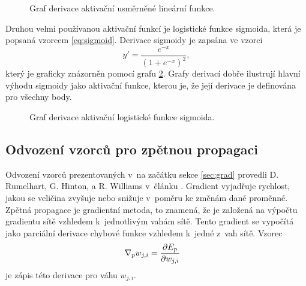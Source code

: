 \begin{figure}
\begin{adjustbox}{center}
\end{adjustbox}
\caption{Graf derivace aktivační usměrněné lineární funkce.}
\label{gr:relu_der}
\end{figure}

Druhou velmi používanou aktivační funkcí je logistické funkce sigmoida, která je popsaná vzorcem \ref{eq:sigmoid}.
Derivace sigmoidy je zapsána ve vzorci \begin{equation}y'=\frac{e^{-x}}{(1+e^{-x})^2},\label{eq:sigmoid_der}\end{equation} který je graficky znázorněn pomocí grafu \ref{gr:sigmoid_der}.
Grafy derivací dobře ilustrují hlavní výhodu sigmoidy jako aktivační funkce, kterou je, že její derivace je definována pro všechny body.

\begin{figure}
\begin{adjustbox}{center}
\end{adjustbox}
\caption{Graf derivace aktivační logistické funkce sigmoida.}
\label{gr:sigmoid_der}
\end{figure}

\subsection{Odvození vzorců pro zpětnou propagaci}
\label{sub:bpp}

Odvození vzorců prezentovaných v~na začátku sekce \ref{sec:grad} provedli D. Rumelhart, G. Hinton, a R. Williams v~článku \cite{Rumelhart1986}.
Gradient vyjadřuje rychlost, jakou se veličina zvyšuje nebo snižuje v~poměru ke změnám dané proměnné.
Zpětná propagace je gradientní metoda, to znamená, že je založená na výpočtu gradientu sítě vzhledem k~jednotlivým vahám sítě.
Tento gradient se vypočítá jako parciální derivace chybové funkce vzhledem k~jedné z~vah sítě.
Vzorec \begin{align}\nabla_{p}w_{j,i}&=\pdv{E_p}{w_{j,i}}\label{eq:grad}\end{align} je zápis této derivace pro váhu $w_{j,i}$.

